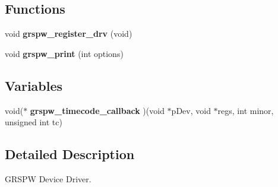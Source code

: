 \subsection*{Functions}
\begin{DoxyCompactItemize}
\item 
\mbox{\label{group__spw_ga1a5c116f1f64dc2a91f3b16300481d53}} 
void {\bfseries grspw\+\_\+register\+\_\+drv} (void)
\item 
\mbox{\label{group__spw_ga2d6e83f98b8f631d4209249bca93b787}} 
void {\bfseries grspw\+\_\+print} (int options)
\end{DoxyCompactItemize}
\subsection*{Variables}
\begin{DoxyCompactItemize}
\item 
\mbox{\label{group__spw_ga7519755c1b02638c8fd9ee024ae6eb20}} 
void($\ast$ {\bfseries grspw\+\_\+timecode\+\_\+callback} )(void $\ast$p\+Dev, void $\ast$regs, int minor, unsigned int tc)
\end{DoxyCompactItemize}


\subsection{Detailed Description}
G\+R\+S\+PW Device Driver. 


